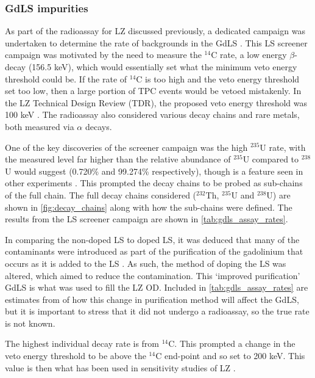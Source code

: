 \subsubsection{GdLS impurities}
\par
As part of the radioassay for LZ discussed previously, a dedicated campaign was undertaken to determine the rate of backgrounds in the GdLS \cite{scotthaselschwardt_thesis_ref}.
This LS screener campaign was motivated by the need to measure the $^{14}$C rate, a low energy $\beta$-decay (156.5 keV), which would essentially set what the minimum veto energy threshold could be.
If the rate of $^{14}$C is too high and the veto energy threshold set too low, then a large portion of TPC events would be vetoed mistakenly.
In the LZ Technical Design Review (TDR), the proposed veto energy threshold was 100 keV \cite{LZ_TechnicalDesignReview_ref}.
The radioassay also considered various decay chains and rare metals, both measured via $\alpha$ decays.
\par
One of the key discoveries of the screener campaign was the high ${}^{235}$U rate, with the measured level far higher than the relative abundance of ${}^{235}$U compared to ${}^{238}$U would suggest (0.720\% and 99.274\% respectively), though is a feature seen in other experiments \cite{javierperez_thesis_ref,superkamiokande_neutron_tagging_ref}.
This prompted the decay chains to be probed as sub-chains of the full chain.
The full decay chains considered ($^{232}$Th, $^{235}$U and $^{238}$U) are shown in \autoref{fig:decay_chains} along with how the sub-chains were defined.
The results from the LS screener campaign are shown in \autoref{tab:gdls_assay_rates}.
\par
In comparing the non-doped LS to doped LS, it was deduced that many of the contaminants were introduced as part of the purification of the gadolinium that occurs as it is added to the LS \cite{scotthaselschwardt_thesis_ref}.
As such, the method of doping the LS was altered, which aimed to reduce the contamination.
This `improved purification' GdLS is what was used to fill the LZ OD.
Included in \autoref{tab:gdls_assay_rates} are estimates from \cite{scotthaselschwardt_thesis_ref} of how this change in purification method will affect the GdLS, but it is important to stress that it did not undergo a radioassay, so the true rate is not known.
\par
The highest individual decay rate is from ${}^{14}$C.
This prompted a change in the veto energy threshold to be above the ${}^{14}$C end-point and so set to 200 keV.
This value is then what has been used in sensitivity studies of LZ \cite{LZ_projected_sensitivity_paper_ref}.

